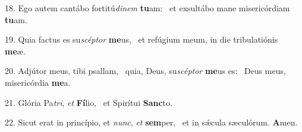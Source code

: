 18. Ego autem cantábo fortitú\textit{di}\textit{nem} \textbf{tu}am: \ast\  et exsultábo mane misericórdiam \textbf{tu}am.\

19. Quia factus es su\textit{scép}\textit{tor} \textbf{me}us, \ast\  et refúgium meum, in die tribulatiónis \textbf{me}æ.\

20. Adjútor meus, tibi psallam, \dag\  quia, Deus, su\textit{scép}\textit{tor} \textbf{me}us es: \ast\  Deus meus, misericórdia \textbf{me}a.\

21. Glória Pa\textit{tri}, \textit{et} \textbf{Fí}lio, \ast\  et Spirítui \textbf{Sanc}to.\

22. Sicut erat in princípio, et \textit{nunc}, \textit{et} \textbf{sem}per, \ast\  et in sǽcula sæculórum. \textbf{A}men.\

